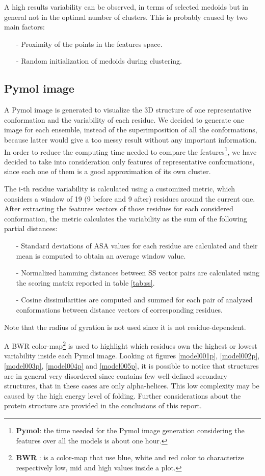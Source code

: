 A high results variability can be observed, in terms of selected medoids but in general not in the optimal number of clusters.
This is probably caused by two main factors:
\begin{itemize}
    \item[-] Proximity of the points in the features space.
    \item[-] Random initialization of medoids during clustering.
\end{itemize}

\subsection{Pymol image}
A Pymol image is generated to visualize the 3D structure of one representative conformation and the variability of each residue.
We decided to generate one image for each ensemble, instead of the superimposition of all the conformations, because latter would give a too messy result without any important information.
In order to reduce the computing time needed to compare the features\footnote{\textbf{Pymol}: the time needed for the Pymol image generation considering the features over all the models is about one hour.}, we have decided to take into consideration only features of representative conformations, since each one of them is a good approximation of its own cluster.

\medskip
The i-th residue variability is calculated using a customized metric, which considers a window of 19 (9 before and 9 after) residues around the current one. After extracting the features vectors of those residues for each considered conformation, the metric calculates the variability as the sum of the following partial distances:
\begin{itemize}
\item[-] Standard deviations of ASA values for each residue are calculated and their mean is computed to obtain an average window value.
\item[-] Normalized hamming distances between SS vector pairs are calculated using the scoring matrix reported in table \ref{tab:ss}.
\item[-] Cosine dissimilarities are computed and summed for each pair of analyzed conformations between distance vectors of corresponding residues.
\end{itemize}
Note that the radius of gyration is not used since it is not residue-dependent.

\medskip
A BWR color-map\footnote{\textbf{BWR} : is a color-map that use blue, white and red color to characterize respectively low, mid and high values inside a plot.} is used to highlight which residues own the highest or lowest variability inside each Pymol image.
Looking at figures \ref{model001p}, \ref{model002p}, \ref{model003p}, \ref{model004p} and \ref{model005p}, it is possible to notice that structures are in general very disordered since contains few well-defined secondary structures, that in these cases are only alpha-helices. This low complexity may be caused by the high energy level of folding.
Further considerations about the protein structure are provided in the conclusions of this report.

